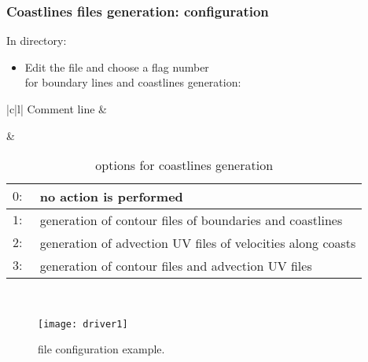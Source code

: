 \begin{frame}
\frametitle{Coastlines files generation:  configuration}

\centerline{In  directory:}
\small{
\begin{itemize}
\item Edit the  file and choose a flag number\\
 for boundary lines and coastlines generation:
\end{itemize}
}
\vspace{-0.5cm}

\begin{table}
\caption{ options for coastlines generation}

\centering
\tiny
\begin{tabular}{|c|l|}
\hline 
{ { Comment line}}
 & 
\\ \hline  \hline  
 
&
\begin{tabular}{r|l}
{\sf $0:\ $ } & {\sf no action is performed} \\ \hline
{\sf $1:\ $ } & {\sf generation of contour files of boundaries and coastlines } \\ \hline
{\sf $2:\ $ } & {\sf generation of advection UV files of velocities along coasts} \\ \hline
{\sf $3:\ $ } & {\sf generation of contour files and advection UV files}
\end{tabular} 
\\ \hline 
\end{tabular}



\end{table}


\vspace{-0.1cm}

\begin{figure}
\centering
\texttt{[image: driver1]}
\caption{ file configuration example.}
\end{figure}

\end{frame}

